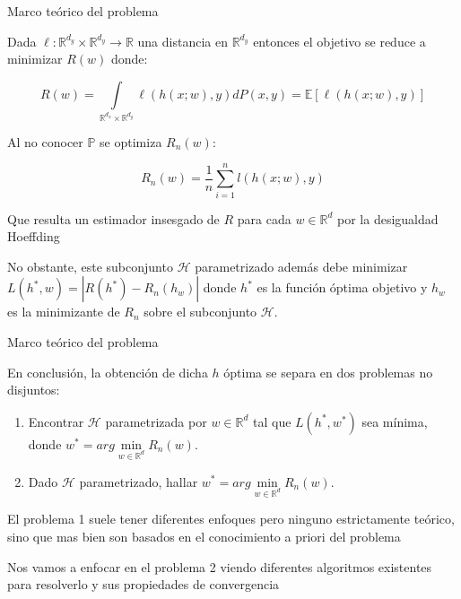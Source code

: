 \documentclass{beamer}
\newcommand{\R}{{\mathbb{R}}}
\newcommand{\abs}[1]{\left\lvert#1\right\rvert}
\begin{document}
\begin{frame}{Marco te\'orico del problema}

Dada $ \ell : \mathbb{R}^{d_y} \times \mathbb{R}^{d_y} \rightarrow \mathbb{R}$ una distancia en $\R^{d_y}$ entonces el objetivo se reduce a minimizar $R(w)$ donde:

\begin{equation*}
	R(w) = \int\limits_{\mathbb{R}^{d_x}\times \mathbb{R}^{d_y}} {\ell \left(h(x;w), y\right) dP(x,y)} = \mathbb{E} \left[ \ell \left( h(x;w), y \right) \right]
\end{equation*}

\pause

Al no conocer $\mathbb{P}$ se optimiza $R_n(w)$:

\begin{equation*}
R_n(w) = \frac{1}{n} \sum\limits_{i=1}^{n} {l \left( h(x;w), y\right)}
\end{equation*}

Que resulta un estimador insesgado de $R$ para cada $w \in \R^d$ por la desigualdad Hoeffding \cite{hoeffding:1962} 

\pause

No obstante, este subconjunto $\mathcal{H}$ parametrizado adem\'as debe minimizar $L(h^*, w) = \abs{R(h^*) - R_n(h_w)}$ donde $h^*$ es la funci\'on \'optima objetivo y $h_w$ es la minimizante de $R_n$ sobre el subconjunto $\mathcal{H}$.

\end{frame}

\begin{frame}{Marco te\'orico del problema}

En conclusi\'on, la obtenci\'on de dicha $h$ \'optima se separa en dos problemas no disjuntos:

\begin{enumerate}
	\item Encontrar $\mathcal{H}$ parametrizada por $w\in \R^d$ tal que $L(h^*, w^*)$ sea m\'inima, donde $w^* = arg\min\limits_{w \in \R^d}{R_n(w)}$.
	\item Dado $\mathcal{H}$ parametrizado, hallar $w^* = arg\min\limits_{w \in \R^d}{R_n(w)}$.
\end{enumerate}

\pause

El problema 1  suele tener diferentes enfoques pero ninguno estrictamente te\'orico, sino que mas bien son basados en el conocimiento a priori del problema

Nos vamos a enfocar en el problema 2 viendo diferentes algoritmos existentes para resolverlo y sus propiedades de convergencia

\end{frame}
\end{document}
